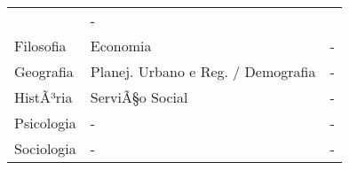 \documentclass[]{article}
\begin{document}
\begin{longtable}[]{@{}lll@{}}
\begin{minipage}[t]{0.03\columnwidth}
\end{minipage} & \begin{minipage}[t]{0.03\columnwidth}\raggedright\strut
-\strut
\end{minipage}\tabularnewline
\begin{minipage}[t]{0.03\columnwidth}\raggedright\strut
Filosofia\strut
\end{minipage} & \begin{minipage}[t]{0.03\columnwidth}\raggedright\strut
Economia\strut
\end{minipage} & \begin{minipage}[t]{0.03\columnwidth}\raggedright\strut
-\strut
\end{minipage}\tabularnewline
\begin{minipage}[t]{0.03\columnwidth}\raggedright\strut
Geografia\strut
\end{minipage} & \begin{minipage}[t]{0.03\columnwidth}\raggedright\strut
Planej. Urbano e Reg. / Demografia\strut
\end{minipage} & \begin{minipage}[t]{0.03\columnwidth}\raggedright\strut
-\strut
\end{minipage}\tabularnewline
\begin{minipage}[t]{0.03\columnwidth}\raggedright\strut
HistÃ³ria\strut
\end{minipage} & \begin{minipage}[t]{0.03\columnwidth}\raggedright\strut
ServiÃ§o Social\strut
\end{minipage} & \begin{minipage}[t]{0.03\columnwidth}\raggedright\strut
-\strut
\end{minipage}\tabularnewline
\begin{minipage}[t]{0.03\columnwidth}\raggedright\strut
Psicologia\strut
\end{minipage} & \begin{minipage}[t]{0.03\columnwidth}\raggedright\strut
-\strut
\end{minipage} & \begin{minipage}[t]{0.03\columnwidth}\raggedright\strut
-\strut
\end{minipage}\tabularnewline
\begin{minipage}[t]{0.03\columnwidth}\raggedright\strut
Sociologia\strut
\end{minipage} & \begin{minipage}[t]{0.03\columnwidth}\raggedright\strut
-\strut
\end{minipage} & \begin{minipage}[t]{0.03\columnwidth}\raggedright\strut
-\strut
\end{minipage}\tabularnewline
\bottomrule
\end{longtable}
\end{document}
